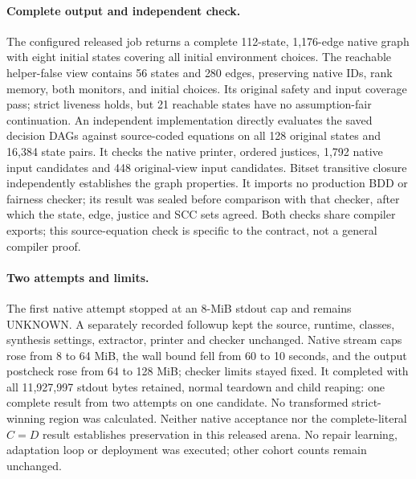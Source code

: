 \paragraph{Complete output and independent check.}
The configured released job returns a complete 112-state, 1,176-edge
native graph with eight initial states covering all initial environment choices. The reachable helper-false
view contains 56 states and 280 edges, preserving native IDs, rank memory,
both monitors, and initial choices.
Its original safety and input coverage pass; strict liveness holds,
but 21 reachable states have no assumption-fair continuation.
An independent implementation directly evaluates the saved decision DAGs
against source-coded equations on all 128 original states and 16,384
state pairs. It checks the native printer, ordered justices, 1,792 native
input candidates and 448 original-view input candidates. Bitset transitive
closure independently establishes the graph properties. It imports no
production BDD or fairness checker; its result was sealed before comparison
with that checker, after which the state, edge, justice and SCC sets agreed.
Both checks share compiler exports; this source-equation check is specific to the contract, not a general compiler proof.

\paragraph{Two attempts and limits.}
The first native attempt stopped at an 8-MiB stdout cap and remains UNKNOWN.
A separately recorded followup kept the source, runtime, classes, synthesis
settings, extractor, printer and checker unchanged. Native stream caps
rose from 8 to 64 MiB, the wall bound fell from 60 to 10 seconds, and
the output postcheck rose from 64 to 128 MiB; checker limits stayed fixed.
It completed with all 11,927,997 stdout bytes retained, normal teardown
and child reaping: one complete result from two attempts on one candidate.
No transformed strict-winning region was calculated. Neither native
acceptance nor the complete-literal $C=D$ result establishes preservation
in this released arena. No repair learning, adaptation loop or deployment
was executed; other cohort counts remain unchanged.



